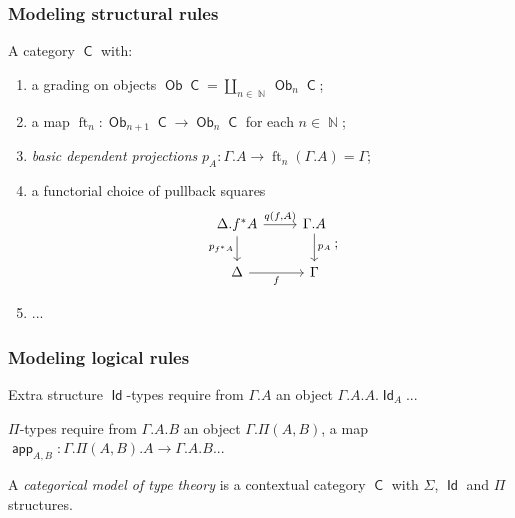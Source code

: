 \documentclass{beamer}
\DeclareMathOperator{\Id}{\mathsf{Id}}
\DeclareMathOperator{\sfC}{\mathsf{C}}
\DeclareMathOperator{\N}{\mathbb{N}}
\DeclareMathOperator{\Ob}{\mathsf{Ob}}
\DeclareMathOperator{\ft}{ft}
\DeclareMathOperator{\app}{\mathsf{app}}
\begin{document}
\begin{frame}
  \frametitle{Modeling structural rules}

  \begin{definition}
    A category $\sfC$ with:
    \begin{enumerate}
      \item a grading on objects $\Ob\sfC=\coprod_{n\in\N}\Ob_n\sfC$;
      \item a map $\ft_n\colon\Ob_{n+1}\sfC\rightarrow\Ob_n\sfC$ for each
        $n\in\N$;
      \item \emph{basic dependent projections}
        $p_A\colon\Gamma.A\rightarrow\ft_n(\Gamma.A)=\Gamma$;
      \item a functorial choice of pullback squares
        \[\begin{tikzcd}[ampersand replacement=\&]
          {\Delta.f^*A} \& {\Gamma.A} \\
          \Delta \& \Gamma
          \arrow["{p_A}", from=1-2, to=2-2]
          \arrow["{p_{f^*A}}"', from=1-1, to=2-1]
          \arrow["{q(f,A)}", from=1-1, to=1-2]
          \arrow["f"', from=2-1, to=2-2]
        \end{tikzcd};\]
      \item ...
    \end{enumerate}
  \end{definition}
\end{frame}

\begin{frame}
  \frametitle{Modeling logical rules}

  \begin{block}{Extra structure}
    $\Id$-types require from $\Gamma.A$ an object $\Gamma.A.A.\Id_A$...
    
    $\Pi$-types require from $\Gamma.A.B$ an object $\Gamma.\Pi(A,B)$, a map
    $\app_{A,B}\colon\Gamma.\Pi(A,B).A\rightarrow\Gamma.A.B$...
  \end{block}

  \begin{defn}
    A \emph{categorical model of type theory} is a contextual category $\sfC$
    with $\Sigma$, $\Id$ and $\Pi$ structures.
  \end{defn}
\end{frame}
\end{document}
